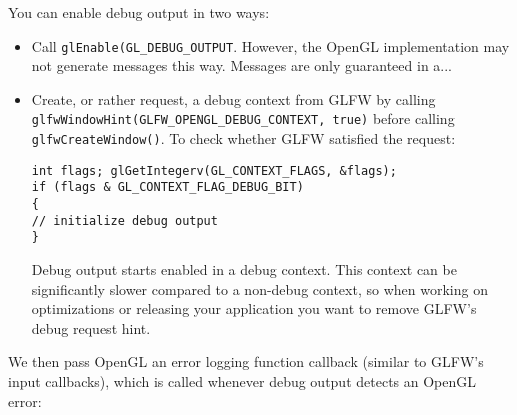 \documentclass[8pt, table, xcdraw]{article}%
\begin{document}
You can enable debug output in two ways:
\begin{itemize}
    \item Call \lstinline{glEnable(GL_DEBUG_OUTPUT}. However, the OpenGL implementation may not generate messages this way. Messages are only guaranteed in a...
    \item Create, or rather request, a debug context from GLFW by calling \lstinline{glfwWindowHint(GLFW_OPENGL_DEBUG_CONTEXT, true)} before calling \lstinline|glfwCreateWindow()|. To check whether GLFW satisfied the request:
    
    \begin{lstlisting}
int flags; glGetIntegerv(GL_CONTEXT_FLAGS, &flags);
if (flags & GL_CONTEXT_FLAG_DEBUG_BIT)
{
// initialize debug output
}
    \end{lstlisting}
    
    Debug output starts enabled in a debug context. This context can be significantly slower compared to a non-debug context, so when working on optimizations or releasing your application you want to remove GLFW's debug request hint.
\end{itemize}

We then pass OpenGL an error logging function callback (similar to GLFW's input callbacks), which is called whenever debug output detects an OpenGL error:
\end{document}
